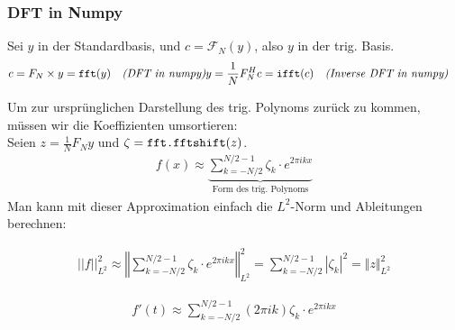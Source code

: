 \subsubsection{DFT in Numpy}

Sei $y$ in der Standardbasis, und $c = \mathcal{F}_N(y)$, also $y$ in der trig. Basis.
\begin{align*}
    c = F_N \times y = \texttt{fft}(y)\quad \text{\textit{(DFT in numpy)}} & y = \frac{1}{N}F_N^Hc = \texttt{ifft}(c)\quad \textit{(Inverse DFT in numpy)}
\end{align*}

Um zur ursprünglichen Darstellung des trig. Polynoms zurück zu kommen, müssen wir die Koeffizienten umsortieren: \\
Seien $z = \frac{1}{N} F_N y$ und  $\zeta = \verb|fft.fftshift|(z)$.
\begin{align*}
    f(x) \approx \underbrace{\sum_{k=-N/2}^{N/2-1} \zeta_k \cdot e^{2 \pi ikx} }_{\text{Form des trig. Polynoms}}
\end{align*}
\setcounter{all}{13}
\inlineremark Man kann mit dieser Approximation einfach die $L^2$-Norm und Ableitungen berechnen:
\vspace{-1.5pc}
\begin{multicols}{2}
    \begin{align*}
        ||f||^2_{L^2} \approx \left\Vert \sum_{k=-N/2}^{N/2-1} \zeta_k \cdot e^{2 \pi ikx} \right\Vert^2_{L^2} = \sum_{k=-N/2}^{N/2-1} |\zeta_k|^2 = \Vert z \Vert^2_{L^2}
    \end{align*}

    \newcolumn

    \begin{align*}
        f'(t) \approx \sum_{k=-N/2}^{N/2-1} (2\pi ik) \zeta_k \cdot e^{2 \pi ikx}
    \end{align*}
\end{multicols}
